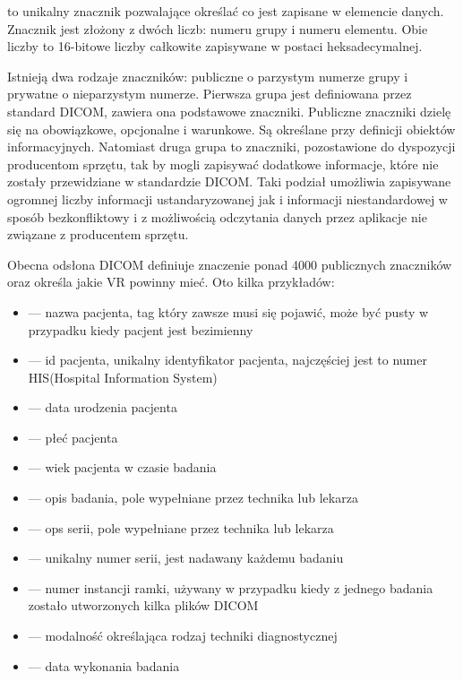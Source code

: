 \par
{} to unikalny znacznik pozwalające określać co jest zapisane w elemencie danych.
Znacznik jest złożony z dwóch liczb: numeru grupy i numeru elementu.
Obie liczby to 16-bitowe liczby całkowite zapisywane w postaci  heksadecymalnej.

\par
Istnieją dwa rodzaje znaczników: publiczne o parzystym numerze grupy i prywatne o nieparzystym numerze.
Pierwsza grupa jest definiowana przez standard DICOM, zawiera ona podstawowe znaczniki.
Publiczne znaczniki dzielę się na obowiązkowe, opcjonalne i warunkowe.
Są określane przy definicji obiektów informacyjnych.
Natomiast druga grupa to znaczniki, pozostawione do dyspozycji producentom sprzętu, tak by mogli zapisywać dodatkowe informacje, które nie zostały przewidziane w standardzie DICOM.
Taki podział umożliwia zapisywane ogromnej liczby informacji ustandaryzowanej jak i informacji niestandardowej w sposób bezkonfliktowy i z możliwością odczytania danych przez aplikacje nie związane z producentem sprzętu.

\par
Obecna odsłona DICOM definiuje znaczenie ponad 4000 publicznych znaczników oraz określa jakie VR powinny mieć.
Oto kilka przykładów:
\begin{itemize}
    \item {} --- nazwa pacjenta, tag który zawsze musi się pojawić, może być pusty w przypadku kiedy pacjent jest bezimienny
    \item {} --- id pacjenta, unikalny identyfikator pacjenta, najczęściej jest to numer HIS(Hospital Information System)
    \item {} --- data urodzenia pacjenta
    \item {} --- płeć pacjenta
    \item {} --- wiek pacjenta w czasie badania
    \item {} --- opis badania, pole wypełniane przez technika lub lekarza
    \item {} --- ops serii, pole wypełniane przez technika lub lekarza
    \item {} --- unikalny numer serii, jest nadawany każdemu badaniu
    \item {} --- numer instancji ramki, używany w przypadku kiedy z jednego badania zostało utworzonych kilka plików DICOM
    \item {} --- modalność określająca rodzaj techniki diagnostycznej
    \item {} --- data wykonania badania
\end{itemize}


